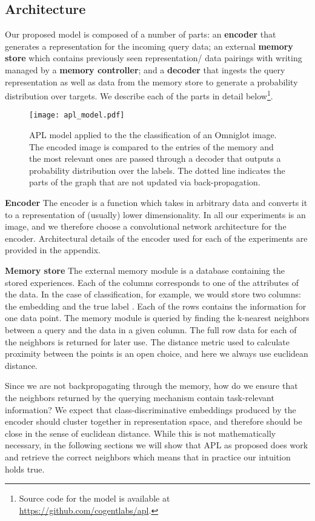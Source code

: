 \documentclass{article} \usepackage{iclr2019_conference,times}
\begin{document}
\subsection{Architecture}
Our proposed model is composed of a number of parts: an \textbf{encoder} that generates a representation for the incoming query data; an external \textbf{memory store} which contains previously seen representation/ data pairings with writing managed by a \textbf{memory controller}; and a \textbf{decoder} that ingests the query representation as well as data from the memory store to generate a probability distribution over targets. We describe each of the parts in detail below\footnote{Source code for the model is available at \url{https://github.com/cogentlabs/apl}.}.

\begin{figure}[ht]
\begin{center}
\texttt{[image: apl\_model.pdf]}
\end{center}
\caption{APL model applied to the the classification of an Omniglot image. The encoded image is compared to the entries of the memory and the most relevant ones are passed through a decoder that outputs a probability distribution over the labels. The dotted line indicates the parts of the graph that are not updated via back-propagation.}
\end{figure}

\textbf{Encoder} The encoder is a function which takes in arbitrary data  and converts it to a representation  of (usually) lower dimensionality. In all our experiments  is an image, and we therefore choose a convolutional network architecture for the encoder. Architectural details of the encoder used for each of the experiments are provided in the appendix.

\textbf{Memory store} The external memory module is a database containing the stored experiences. Each of the columns corresponds to one of the attributes of the data. In the case of classification, for example, we would store two columns: the embedding  and the true label . Each of the rows contains the information for one data point. The memory module is queried by finding the k-nearest neighbors between a query and the data in a given column. The full row data for each of the neighbors is returned for later use. The distance metric used to calculate proximity between the points is an open choice, and here we always use euclidean distance.

Since we are not backpropagating through the memory, how do we ensure that the neighbors returned by the querying mechanism contain task-relevant information? We expect that class-discriminative embeddings produced by the encoder should cluster together in representation space, and therefore should be close in the sense of euclidean distance. While this is not mathematically necessary, in the following sections we will show that APL as proposed does work and retrieve the correct neighbors which means that in practice our intuition holds true.
\end{document}
